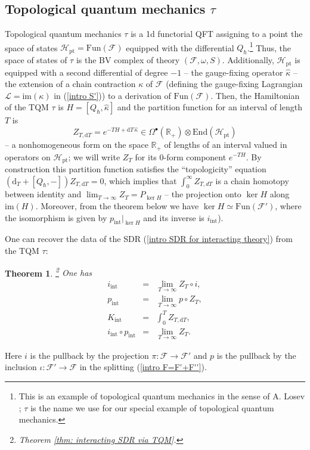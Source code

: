 \documentclass{amsart}
\theoremstyle{plain} %
\newtheorem{introthm}{Theorem}
\theoremstyle{definition}
\theoremstyle{remark}
\newcommand{\mc}{\mathcal}
\newcommand{\mr}{\mathrm}
\newcommand{\bt}{\bullet}
\newcommand{\ra}{\rightarrow}
\newcommand{\wh}{\widehat}
\newcommand{\F}{\mathcal{F}}
\newcommand{\LL}{\mathcal{L}}
\newcommand{\RR}{\mathbb{R}}
\newcommand{\ii}{\mathrm{int}}
\newcommand{\dr}{\mathrm{d}}
\begin{document}
\subsection{Topological quantum mechanics $\tau$}
Topological quantum mechanics $\tau$ is a 1d functorial QFT assigning to a point the space of states $\mc{H}_\mr{pt}=\mr{Fun}(\F)$ equipped with the differential $Q_\hbar$.\footnote{This is an example of topological quantum mechanics in the sense of A. Losev \cite{Losev}; $\tau$ is the name we use for our special example of topological quantum mechanics.
}
Thus, the space of states of $\tau$ is the BV complex of theory $(\F,\omega,S)$. Additionally, $\mc{H}_\mr{pt}$ is equipped with a second differential of degree $-1$ -- the gauge-fixing operator $\wh\kappa$ -- the extension of a chain contraction $\kappa$ of $\F$ (defining the gauge-fixing Lagrangian $\LL=\mr{im}(\kappa)$ in (\ref{intro S'})) to a derivation of $\mr{Fun}(\F)$. Then, the Hamiltonian of the TQM $\tau$ is $H=[Q_\hbar,\wh\kappa]$ and the partition function for an interval of length $T$ is
\begin{equation}\label{intro Z_T,dT}
    Z_{T,\dr T}= e^{-T H+\dr T\, \wh\kappa} \in \Omega^\bt(\RR_+)\otimes \mr{End}(\mc{H}_\mr{pt})
\end{equation}
-- a nonhomogeneous form on the space $\RR_+$ of lengths of an interval valued in operators on $\mc{H}_\mr{pt}$; we will write $Z_T$ for its 0-form component $e^{-TH}$. By construction this partition function satisfies the ``topologicity'' equation ${(\dr_T+[Q_\hbar,-])Z_{T,\dr T}=0}$, which implies that $\int_0^\infty Z_{T,dT}$ is a chain homotopy between identity and $\lim_{T\ra\infty}Z_{T}=P_{\ker H}$ -- the projection onto $\ker H$ along $\mr{im}(H)$. Moreover, from the theorem below we have
$\ker H \simeq \mr{Fun}(\F')$, where the isomorphism is given by $p_\ii|_{\ker H}$ and its inverse is $i_\ii$).

One can recover the data of the SDR (\ref{intro SDR for interacting theory}) from the TQM $\tau$:
\begin{introthm}\!\!\!\footnote{Theorem \ref{thm: interacting SDR via TQM}.}
\label{intro thm C}
    One has 
    \begin{equation}
    \begin{aligned}
        i_\ii&=&\lim_{T\ra\infty} Z_T\circ i,\\
        p_\ii &=&\lim_{T\ra\infty} p\circ Z_T,\\
        K_\ii&=&\int_0^T Z_{T,\dr T},\\
        i_\ii\circ p_\ii&=&\lim_{T\ra\infty} Z_T.
    \end{aligned}
    \end{equation}
\end{introthm}
Here $i$ is the pullback by the projection $\pi\colon\F\ra \F'$ and $p$ is the pullback by the inclusion $\iota\colon \F'\ra \F$ in the splitting (\ref{intro F=F'+F''}). 
\end{document}
